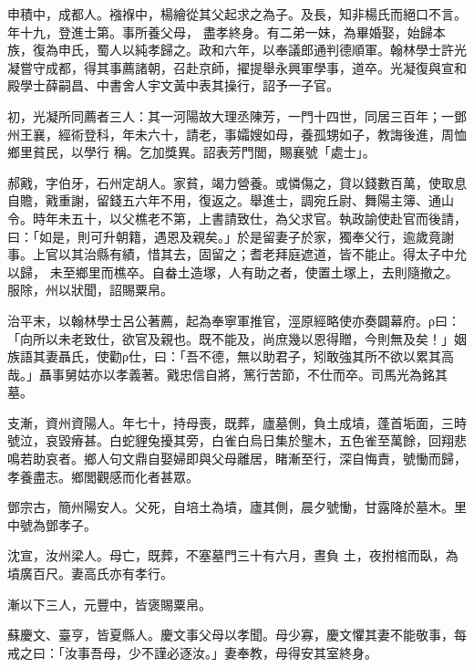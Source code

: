 \begin{pinyinscope}
 申積中，成都人。襁褓中，楊繪從其父起求之為子。及長，知非楊氏而絕口不言。年十九，登進士第。事所養父母，
 盡孝終身。有二弟一妹，為畢婚娶，始歸本族，復為申氏，蜀人以純孝歸之。政和六年，以奉議郎通判德順軍。翰林學士許光凝嘗守成都，得其事薦諸朝，召赴京師，擢提舉永興軍學事，道卒。光凝復與宣和殿學士薛嗣昌、中書舍人宇文黃中表其操行，詔予一子官。



 初，光凝所同薦者三人：其一河陽故大理丞陳芳，一門十四世，同居三百年；一鄧州王襄，經術登科，年未六十，請老，事孀嫂如母，養孤甥如子，教誨後進，周恤鄉里貧民，以學行
 稱。乞加獎異。詔表芳門閭，賜襄號「處士」。



 郝戭，字伯牙，石州定胡人。家貧，竭力營養。或憐傷之，貸以錢數百萬，使取息自贍，戭重謝，留錢五六年不用，復返之。舉進士，調宛丘尉、舞陽主簿、通山令。時年未五十，以父樵老不第，上書請致仕，為父求官。執政諭使赴官而後請，曰：「如是，則可升朝籍，遇恩及親矣。」於是留妻子於家，獨奉父行，逾歲竟謝事。上官以其治縣有績，惜其去，固留之；耆老拜庭遮道，皆不能止。得太子中允以歸，
 未至鄉里而樵卒。自畚土造塚，人有助之者，使置土塚上，去則隨撤之。服除，州以狀聞，詔賜粟帛。



 治平末，以翰林學士呂公著薦，起為奉寧軍推官，涇原經略使亦奏闢幕府。ρ曰：「向所以未老致仕，欲官及親也。既不能及，尚庶幾以恩得贈，今則無及矣！」姻族語其妻聶氏，使勸ρ仕，曰：「吾不德，無以助君子，矧敢強其所不欲以累其高哉。」聶事舅姑亦以孝義著。戭忠信自將，篤行苦節，不仕而卒。司馬光為銘其墓。



 支漸，資州資陽人。年七十，持母喪，既葬，廬墓側，負土成墳，蓬首垢面，三時號泣，哀毀瘠甚。白蛇貍兔擾其旁，白雀白烏日集於壟木，五色雀至萬餘，回翔悲鳴若助哀者。鄉人句文鼎自娶婦即與父母離居，睹漸至行，深自悔責，號慟而歸，孝養盡志。鄉閭觀感而化者甚眾。



 鄧宗古，簡州陽安人。父死，自培土為墳，廬其側，晨夕號慟，甘露降於墓木。里中號為鄧孝子。



 沈宣，汝州梁人。母亡，既葬，不塞墓門三十有六月，晝負
 土，夜拊棺而臥，為墳廣百尺。妻高氏亦有孝行。



 漸以下三人，元豐中，皆褒賜粟帛。



 蘇慶文、臺亨，皆夏縣人。慶文事父母以孝聞。母少寡，慶文懼其妻不能敬事，每戒之曰：「汝事吾母，少不謹必逐汝。」妻奉教，母得安其室終身。




\end{pinyinscope}
